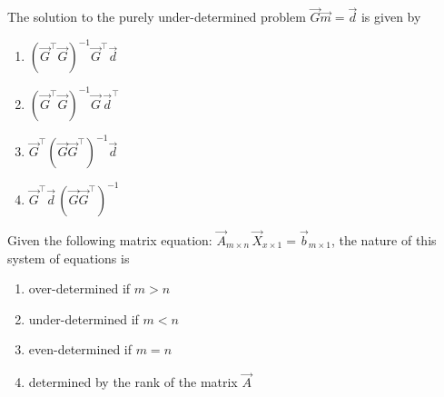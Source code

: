 \item The solution to the purely under-determined problem \(\vec{G}\vec{m}=\vec{d}\) is given by
\hfill{}

\begin{multicols}{1}
\begin{enumerate}
\item \((\vec{G}^{\top}\vec{G})^{-1}\vec{G}^{\top}\vec{d}\)
\item \((\vec{G}^{\top}\vec{G})^{-1}\vec{G}\,\vec{d}^{\top}\)
\item \(\vec{G}^{\top}(\vec{G}\vec{G}^{\top})^{-1}\vec{d}\)
\item \(\vec{G}^{\top}\vec{d}\,(\vec{G}\vec{G}^{\top})^{-1}\)
\end{enumerate}
\end{multicols}
\item Given the following matrix equation:
\(\vec{A}_{m\times n}\,\vec{X}_{x\times 1}=\vec{b}_{m\times 1}\), the nature of this system of equations is
\hfill{}
\begin{multicols}{2}
\begin{enumerate}
\item over-determined if \(m>n\)
\item under-determined if \(m<n\)
\item even-determined if \(m=n\)
\item determined by the rank of the matrix \(\vec{A}\)
\end{enumerate}
\end{multicols}
